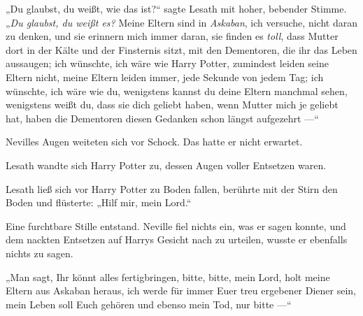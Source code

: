 „Du glaubst, du weißt, wie das ist?“ sagte Lesath mit hoher, bebender Stimme.
„\emph{Du glaubst, du weißt es?} Meine Eltern sind in \emph{Askaban}, ich versuche, nicht daran zu denken, und sie erinnern mich immer daran, sie finden es \emph{toll}, dass Mutter dort in der Kälte und der Finsternis sitzt, mit den Dementoren, die ihr das Leben aussaugen; ich wünschte, ich wäre wie Harry Potter, zumindest leiden seine Eltern nicht, meine Eltern leiden immer, jede Sekunde von jedem Tag; ich wünschte, ich wäre wie du, wenigstens kannst du deine Eltern manchmal sehen, wenigstens weißt du, dass sie dich geliebt haben, wenn Mutter mich je geliebt hat, haben die Dementoren diesen Gedanken schon längst aufgezehrt —“

Nevilles Augen weiteten sich vor Schock. Das hatte er nicht erwartet.

Lesath wandte sich Harry Potter zu, dessen Augen voller Entsetzen waren.

Lesath ließ sich vor Harry Potter zu Boden fallen, berührte mit der Stirn den Boden und flüsterte:
„Hilf mir, mein Lord.“

Eine furchtbare Stille entstand. Neville fiel nichts ein, was er sagen konnte, und dem nackten Entsetzen auf Harrys Gesicht nach zu urteilen, wusste er ebenfalls nichts zu sagen.

„Man sagt, Ihr könnt alles fertigbringen, bitte, bitte, mein Lord, holt meine Eltern aus Askaban heraus, ich werde für immer Euer treu ergebener Diener sein, mein Leben soll Euch gehören und ebenso mein Tod, nur bitte —“

